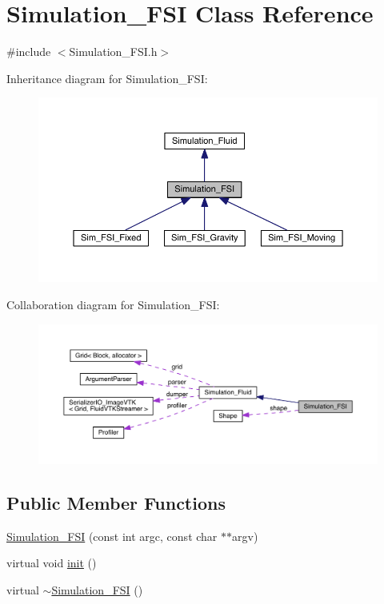\hypertarget{class_simulation___f_s_i}{}\section{Simulation\+\_\+\+F\+S\+I Class Reference}
\label{class_simulation___f_s_i}


{\ttfamily \#include $<$Simulation\+\_\+\+F\+S\+I.\+h$>$}



Inheritance diagram for Simulation\+\_\+\+F\+S\+I\+:\nopagebreak
\begin{figure}[H]
\begin{center}
\leavevmode
\includegraphics[width=350pt]{dc/dbf/class_simulation___f_s_i__inherit__graph}
\end{center}
\end{figure}


Collaboration diagram for Simulation\+\_\+\+F\+S\+I\+:\nopagebreak
\begin{figure}[H]
\begin{center}
\leavevmode
\includegraphics[width=350pt]{d4/d0c/class_simulation___f_s_i__coll__graph}
\end{center}
\end{figure}
\subsection*{Public Member Functions}
\begin{DoxyCompactItemize}
\item 
\hyperlink{class_simulation___f_s_i_aab0996b147031f932457952dc69bfc6e}{Simulation\+\_\+\+F\+S\+I} (const int argc, const char $\ast$$\ast$argv)
\item 
virtual void \hyperlink{class_simulation___f_s_i_a2b00ce68b50616922096fad82f08d46e}{init} ()
\item 
virtual \hyperlink{class_simulation___f_s_i_ae9af86a8d512795b3c634fa10b72beca}{$\sim$\+Simulation\+\_\+\+F\+S\+I} ()
\end{DoxyCompactItemize}
